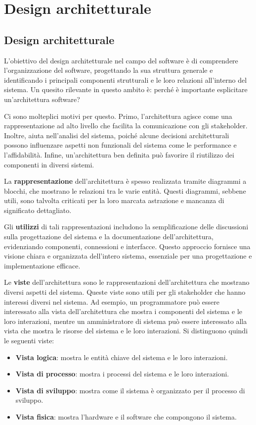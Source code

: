 \chapter{Design architetturale}
\section{Design architetturale}
L'obiettivo del design architetturale nel campo del software è di comprendere
l'organizzazione del software, progettando la sua struttura generale e identificando
i principali componenti strutturali e le loro relazioni all'interno del sistema.
Un quesito rilevante in questo ambito è: perché è importante esplicitare un'architettura
software?

Ci sono molteplici motivi per questo. Primo, l'architettura agisce come una
rappresentazione ad alto livello che facilita la comunicazione con gli stakeholder.
Inoltre, aiuta nell'analisi del sistema, poiché alcune decisioni architetturali possono
influenzare aspetti non funzionali del sistema come le performance e l'affidabilità.
Infine, un'architettura ben definita può favorire il riutilizzo dei componenti in
diversi sistemi.

La \textbf{rappresentazione} dell'architettura è spesso realizzata tramite diagrammi a blocchi,
che mostrano le relazioni tra le varie entità. Questi diagrammi, sebbene utili, sono
talvolta criticati per la loro marcata astrazione e mancanza di significato dettagliato.

Gli \textbf{utilizzi} di tali rappresentazioni includono la semplificazione delle discussioni sulla
progettazione del sistema e la documentazione dell'architettura, evidenziando componenti,
connessioni e interfacce. Questo approccio fornisce una visione chiara e organizzata
dell'intero sistema, essenziale per una progettazione e implementazione efficace.

Le \textbf{viste} dell'architettura sono le rappresentazioni dell'architettura che mostrano
diversi aspetti del sistema. Queste viste sono utili per gli stakeholder che hanno
interessi diversi nel sistema. Ad esempio, un programmatore può essere interessato
alla vista dell'architettura che mostra i componenti del sistema e le loro interazioni,
mentre un amministratore di sistema può essere interessato alla vista che mostra
le risorse del sistema e le loro interazioni.
Si distinguono quindi le seguenti viste:
\begin{itemize}
  \item \textbf{Vista logica}: mostra le entità chiave del sistema e le loro interazioni.
  \item \textbf{Vista di processo}: mostra i processi del sistema e le loro interazioni.
  \item \textbf{Vista di sviluppo}: mostra come il sistema è organizzato per il processo di sviluppo.
  \item \textbf{Vista fisica}: mostra l'hardware e il software che compongono il sistema.
\end{itemize}

